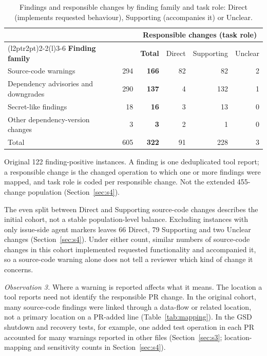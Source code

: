 \documentclass[acmsmall,screen,nonacm,review]{acmart}
\begin{document}
\begin{table}[!tbp]
\caption{Findings and responsible changes by finding family and task role: Direct (implements requested behaviour), Supporting (accompanies it) or Unclear.}
\label{tab:role}
\small
\begin{tabular}{@{}l>{\columncolor{unitshade}}r@{\hspace{10pt}}rrrr@{}}
\toprule
& \multicolumn{1}{>{\columncolor{unitshade}}c}{\textbf{Findings}} & \multicolumn{4}{c}{\textbf{Responsible changes (task role)}}\\
\cmidrule(l{2pt}r{2pt}){2-2}\cmidrule(l){3-6}
\textbf{Finding family} & \multicolumn{1}{>{\columncolor{unitshade}}r}{Reported} & \textbf{Total} & Direct & Supporting & Unclear\\
\midrule
Source-code warnings & 294 & \textbf{166} & 82 & 82 & 2\\
Dependency advisories and downgrades & 290 & \textbf{137} & 4 & 132 & 1\\
Secret-like findings & 18 & \textbf{16} & 3 & 13 & 0\\
Other dependency-version changes & 3 & \textbf{3} & 2 & 1 & 0\\
\midrule
Total & 605 & \textbf{322} & 91 & 228 & 3\\
\bottomrule
\end{tabular}
\par\smallskip\raggedright\footnotesize Original 122 finding-positive instances. A finding is one deduplicated tool report; a responsible change is the changed operation to which one or more findings were mapped, and task role is coded per responsible change. Not the extended 455-change population (Section~\ref{sec:s4}).
\end{table}

The even split between Direct and Supporting source-code changes describes the initial cohort, not a stable population-level balance. Excluding instances with only issue-side agent markers leaves 66 Direct, 79 Supporting and two Unclear changes (Section~\ref{sec:s4}). Under either count, similar numbers of source-code changes in this cohort implemented requested functionality and accompanied it, so a source-code warning alone does not tell a reviewer which kind of change it concerns.

\emph{Observation 3.} Where a warning is reported affects what it means. The location a tool reports need not identify the responsible PR change. In the original cohort, many source-code findings were linked through a data-flow or related location, not a primary location on a PR-added line (Table~\ref{tab:mapping}). In the GSD shutdown and recovery tests, for example, one added test operation in each PR accounted for many warnings reported in other files (Section~\ref{sec:s3}; location-mapping and sensitivity counts in Section~\ref{sec:s4}).
\end{document}
